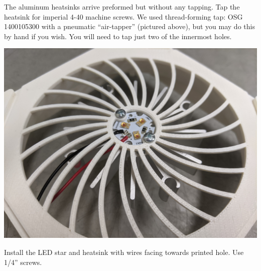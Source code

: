 \documentclass[11pt]{article}
\begin{document}
The aluminum heatsinks arrive preformed but without any tapping.
Tap the heatsink for imperial 4-40 machine screws.
We used thread-forming tap: OSG 1400105300 with a pneumatic ``air-tapper'' (pictured above), but you may do this by hand if you wish.
You will need to tap just two of the innermost holes.

\begin{center}
  \includegraphics[width=\textwidth/2]{"./led-and-heatsink.jpg"}
\end{center}

Install the LED star and heatsink with wires facing towards printed hole.
Use 1/4'' screws.
\end{document}
